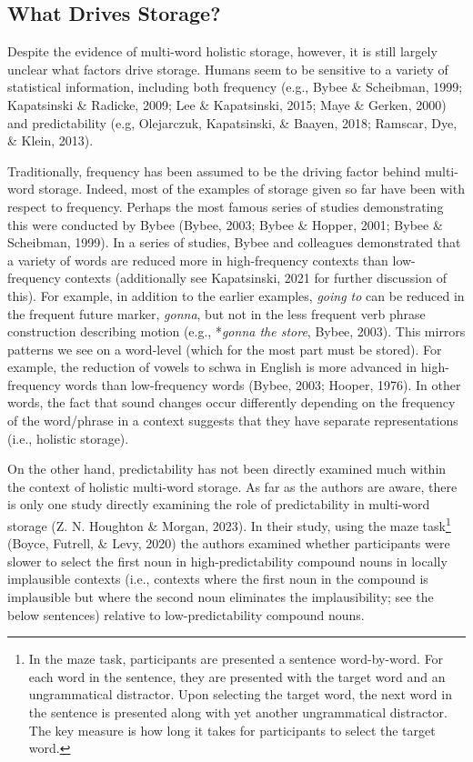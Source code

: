 \documentclass[
  man,floatsintext]{apa6}
\begin{document}
\hypertarget{what-drives-storage}{%
\subsection{What Drives Storage?}\label{what-drives-storage}}

Despite the evidence of multi-word holistic storage, however, it is still largely unclear what factors drive storage. Humans seem to be sensitive to a variety of statistical information, including both frequency (e.g., Bybee \& Scheibman, 1999; Kapatsinski \& Radicke, 2009; Lee \& Kapatsinski, 2015; Maye \& Gerken, 2000) and predictability (e.g, Olejarczuk, Kapatsinski, \& Baayen, 2018; Ramscar, Dye, \& Klein, 2013).

Traditionally, frequency has been assumed to be the driving factor behind multi-word storage. Indeed, most of the examples of storage given so far have been with respect to frequency. Perhaps the most famous series of studies demonstrating this were conducted by Bybee (Bybee, 2003; Bybee \& Hopper, 2001; Bybee \& Scheibman, 1999). In a series of studies, Bybee and colleagues demonstrated that a variety of words are reduced more in high-frequency contexts than low-frequency contexts (additionally see Kapatsinski, 2021 for further discussion of this). For example, in addition to the earlier examples, \emph{going to} can be reduced in the frequent future marker, \emph{gonna}, but not in the less frequent verb phrase construction describing motion (e.g., *\emph{gonna the store}, Bybee, 2003). This mirrors patterns we see on a word-level (which for the most part must be stored). For example, the reduction of vowels to schwa in English is more advanced in high-frequency words than low-frequency words (Bybee, 2003; Hooper, 1976). In other words, the fact that sound changes occur differently depending on the frequency of the word/phrase in a context suggests that they have separate representations (i.e., holistic storage).

On the other hand, predictability has not been directly examined much within the context of holistic multi-word storage. As far as the authors are aware, there is only one study directly examining the role of predictability in multi-word storage (Z. N. Houghton \& Morgan, 2023). In their study, using the maze task\footnote{In the maze task, participants are presented a sentence word-by-word. For each word in the sentence, they are presented with the target word and an ungrammatical distractor. Upon selecting the target word, the next word in the sentence is presented along with yet another ungrammatical distractor. The key measure is how long it takes for participants to select the target word.} (Boyce, Futrell, \& Levy, 2020) the authors examined whether participants were slower to select the first noun in high-predictability compound nouns in locally implausible contexts (i.e., contexts where the first noun in the compound is implausible but where the second noun eliminates the implausibility; see the below sentences) relative to low-predictability compound nouns.
\end{document}
